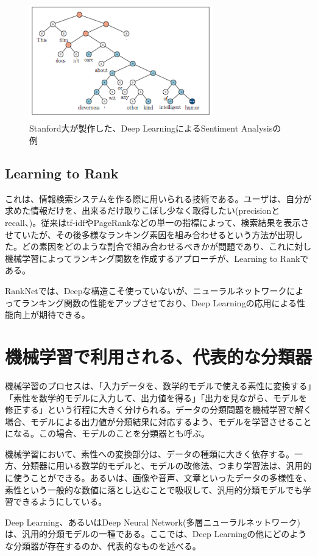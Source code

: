 \begin{figure}[tbp]
 \centering
  \includegraphics[width=80mm]{img/c2/rntn_ex}
 \caption{Stanford大が製作した、Deep LearningによるSentiment Analysisの例}
 \label{c2_rntn_ex}
\end{figure}

\subsection{Learning to Rank}
これは、情報検索システムを作る際に用いられる技術である。ユーザは、自分が求めた情報だけを、出来るだけ取りこぼし少なく取得したい(precisionとrecall、\cite{tsujii1999joho})。従来はtf-idfやPageRank\cite{brin1998anatomy}\cite{page1999pagerank}などの単一の指標によって、検索結果を表示させていたが、その後多様なランキング素因を組み合わせるという方法が出現した。どの素因をどのような割合で組み合わせるべきかが問題であり、これに対し機械学習によってランキング関数を作成するアプローチが、Learning to Rankである。\par
RankNet\cite{burges2005learning}では、Deepな構造こそ使っていないが、ニューラルネットワークによってランキング関数の性能をアップさせており、Deep Learningの応用による性能向上が期待できる。

\section{機械学習で利用される、代表的な分類器}
機械学習のプロセスは、「入力データを、数学的モデルで使える素性に変換する」「素性を数学的モデルに入力して、出力値を得る」「出力を見ながら、モデルを修正する」という行程に大きく分けられる。データの分類問題を機械学習で解く場合、モデルによる出力値が分類結果に対応するよう、モデルを学習させることになる。この場合、モデルのことを分類器とも呼ぶ。\par
機械学習において、素性への変換部分は、データの種類に大きく依存する。一方、分類器に用いる数学的モデルと、モデルの改修法、つまり学習法は、汎用的に使うことができる。あるいは、画像や音声、文章といったデータの多様性を、素性という一般的な数値に落とし込むことで吸収して、汎用的分類モデルでも学習できるようにしている。\par
Deep Learning、あるいはDeep Neural Network(多層ニューラルネットワーク)は、汎用的分類モデルの一種である。ここでは、Deep Learningの他にどのような分類器が存在するのか、代表的なものを述べる。

